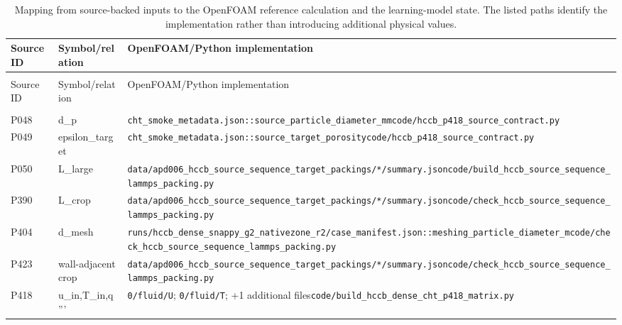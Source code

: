 \begingroup
\scriptsize
\setlength{\tabcolsep}{3pt}
\begin{longtable}{>{\raggedright\arraybackslash}p{2.0cm}>{\raggedright\arraybackslash}p{4.0cm}>{\raggedright\arraybackslash}p{12.2cm}}
\caption{Mapping from source-backed inputs to the OpenFOAM reference calculation and the learning-model state. The listed paths identify the implementation rather than introducing additional physical values.}\label{tab:supp_equation_input_map}\\
\toprule
Source ID & Symbol/relation & OpenFOAM/Python implementation \\
\midrule
\endfirsthead
\multicolumn{3}{l}{\textit{Table \thetable\ continued}}\\
\toprule
Source ID & Symbol/relation & OpenFOAM/Python implementation \\
\midrule
\endhead
\midrule
\multicolumn{3}{r}{\textit{Continued on next page}}\\
\endfoot
\bottomrule
\endlastfoot
P048 & d\_\allowbreak{}p & \nolinkurl{cht_smoke_metadata.json::source_particle_diameter_mm}\newline \nolinkurl{code/hccb_p418_source_contract.py} \\
P049 & epsilon\_\allowbreak{}target & \nolinkurl{cht_smoke_metadata.json::source_target_porosity}\newline \nolinkurl{code/hccb_p418_source_contract.py} \\
P050 & L\_\allowbreak{}large & \nolinkurl{data/apd006_hccb_source_sequence_target_packings/*/summary.json}\newline \nolinkurl{code/build_hccb_source_sequence_lammps_packing.py} \\
P390 & L\_\allowbreak{}crop & \nolinkurl{data/apd006_hccb_source_sequence_target_packings/*/summary.json}\newline \nolinkurl{code/check_hccb_source_sequence_lammps_packing.py} \\
P404 & d\_\allowbreak{}mesh & \nolinkurl{runs/hccb_dense_snappy_g2_nativezone_r2/case_manifest.json::meshing_particle_diameter_m}\newline \nolinkurl{code/check_hccb_source_sequence_lammps_packing.py} \\
P423 & wall-adjacent crop & \nolinkurl{data/apd006_hccb_source_sequence_target_packings/*/summary.json}\newline \nolinkurl{code/check_hccb_source_sequence_lammps_packing.py} \\
P418 & u\_\allowbreak{}in,\allowbreak{}T\_\allowbreak{}in,\allowbreak{}q''' & \nolinkurl{0/fluid/U}; \nolinkurl{0/fluid/T}; +1 additional files\newline \nolinkurl{code/build_hccb_dense_cht_p418_matrix.py} \\

\end{longtable}
